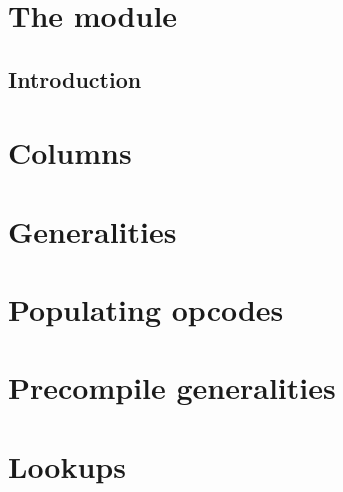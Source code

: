 

\section{The \oobMod{} module}
\subsection{Introduction}               \label{oob: intro}                  
\section{Columns}                       \label{oob: columns}              
\section{Generalities}                  \label{oob: generalities}        
\section{Populating opcodes}            \label{oob: opcodes}             
\section{Precompile generalities}       \label{oob: precompiles}         
\section{Lookups}                       \label{oob: lookups}                                                   
